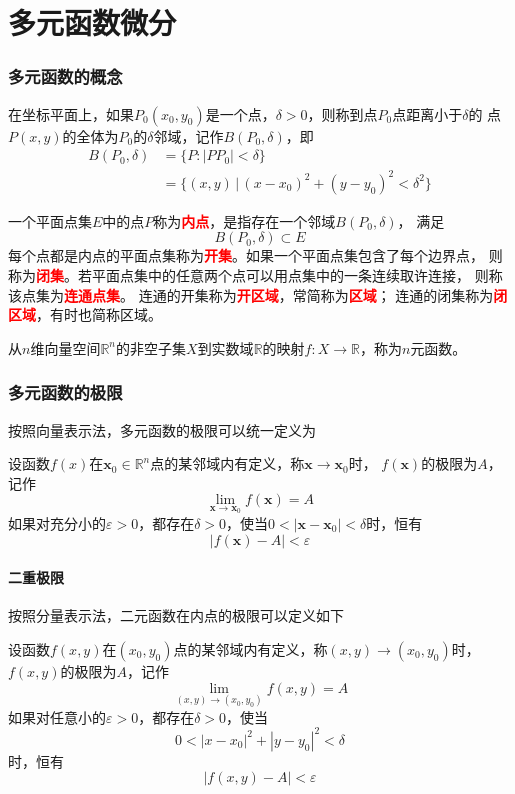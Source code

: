 \part{多元函数微分}
\section{多元函数的概念}
在坐标平面上，如果$P_0(x_0,y_0)$是一个点，$\delta > 0$，则称到点$P_0$点距离小于$\delta$的
点$P(x,y)$的全体为$P_0$的$\delta$邻域，记作$B(P_0,\delta)$，即
\begin{align*}
    B(P_0,\delta) & = \{P:|PP_0|<\delta\}                              \\
                  & = \{(x,y)\,|\, (x-x_0)^2 + (y-y_0)^2 < \delta^2 \}
\end{align*}

一个平面点集$E$中的点$P$称为\textcolor{red}{\textbf{\textsf{内点}}}，是指存在一个邻域$B(P_0,\delta)$，
满足
\[ B(P_0,\delta) \subset E \]
每个点都是内点的平面点集称为\textcolor{red}{\textbf{\textsf{开集}}}。如果一个平面点集包含了每个边界点，
则称为\textcolor{red}{\textbf{\textsf{闭集}}}。若平面点集中的任意两个点可以用点集中的一条连续取许连接，
则称该点集为\textcolor{red}{\textbf{\textsf{连通点集}}}。
连通的开集称为\textcolor{red}{\textbf{\textsf{开区域}}}，常简称为\textcolor{red}{\textbf{\textsf{区域}}}；
连通的闭集称为\textcolor{red}{\textbf{\textsf{闭区域}}}，有时也简称区域。

从$n$维向量空间$\mathbb{R}^n$的非空子集$X$到实数域$\mathbb{R}$的映射$f:X\to \mathbb{R}$，称为$n$元函数。

\section{多元函数的极限}
按照向量表示法，多元函数的极限可以统一定义为
\begin{definition}
    设函数$f(x)$在$\bm{x}_0\in\mathbb{R}^n$点的某邻域内有定义，称$\bm{x}\to\bm{x}_0$时，
    $f(\bm{x})$的极限为$A$，记作
    \[ \lim_{\bm{x}\to\bm{x}_0}f(\bm{x})=A \]
    如果对充分小的$\varepsilon>0$，都存在$\delta>0$，使当$0<|\bm{x}-\bm{x}_0|<\delta$时，恒有
    \[ |f(\bm{x})-A|<\varepsilon \]
\end{definition}

\subsection{二重极限}
按照分量表示法，二元函数在内点的极限可以定义如下
\begin{definition}
    设函数$f(x,y)$在$(x_0,y_0)$点的某邻域内有定义，称$(x,y)\to(x_0,y_0)$时，$f(x,y)$的极限为$A$，记作
    \[ \lim_{(x,y)\to(x_0,y_0)} f(x,y) = A \]
    如果对任意小的$\varepsilon>0$，都存在$\delta>0$，使当
    \[ 0<|x-x_0|^2 +|y-y_0|^2<\delta \]
    时，恒有
    \[ |f(x,y)-A| < \varepsilon \]
\end{definition}

